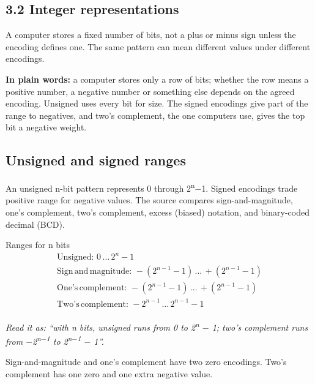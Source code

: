 \documentclass[11pt]{article}
\begin{document}
\begin{keepsection}
\section{3.2 Integer representations}

A computer stores a fixed number of bits, not a plus or minus sign unless the encoding defines one. The same pattern can mean different values under different encodings.

\begin{plainbox}\textbf{In plain words:} a computer stores only a row of bits; whether the row means a positive number, a negative number or something else depends on the agreed encoding. Unsigned uses every bit for size. The signed encodings give part of the range to negatives, and two’s complement, the one computers use, gives the top bit a negative weight.\end{plainbox}

\begin{keepsection}
\subsection{Unsigned and signed ranges}

An unsigned n-bit pattern represents 0 through 2\textsuperscript{n}\ensuremath{-}1. Signed encodings trade positive range for negative values. The source compares sign-and-magnitude, one’s complement, two’s complement, excess (biased) notation, and binary-coded decimal (BCD).

\begin{equationcard}{Ranges for n bits}
\[ \begin{gathered} \text{Unsigned}:\, 0\, …\, 2^{{n}}-1 \\ \text{Sign}\, \text{and}\, \text{magnitude}:\, -(2^{{n}-1}-1)\, …\, +(2^{{n}-1}-1) \\ \text{One}’\mathrm{s}\, \text{complement}:\, -(2^{{n}-1}-1)\, …\, +(2^{{n}-1}-1) \\ \text{Two}’\mathrm{s}\, \text{complement}:\, -2^{{n}-1}\, …\, 2^{{n}-1}-1 \end{gathered} \]
{\small \emph{Read it as: “with n bits, unsigned runs from 0 to 2\textsuperscript{n} \ensuremath{-} 1; two’s complement runs from \ensuremath{-}2\textsuperscript{n\ensuremath{-}1} to 2\textsuperscript{n\ensuremath{-}1} \ensuremath{-} 1”.}\par Sign-and-magnitude and one’s complement have two zero encodings. Two’s complement has one zero and one extra negative value.}
\end{equationcard}


\end{keepsection}
\end{keepsection}
\end{document}
